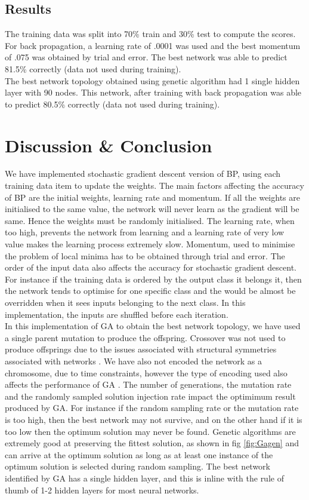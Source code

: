 \subsection{Results}
The training data was split into 70\% train and 30\% test to compute the scores. \\
For back propagation, a learning rate of .0001 was used and the best momentum of .075 was obtained by trial and error. The best network was able to predict  81.5\%  correctly (data not used during training).\\
The best network topology obtained using genetic algorithm had 1 single hidden layer with 90 nodes. This network, after training with back propagation was able to predict  80.5\%  correctly (data not used during training).
\section{Discussion \& Conclusion}
We have implemented stochastic gradient descent version of BP,  using each training data item to update the weights. The main factors affecting the accuracy of BP are the initial weights, learning rate and momentum. If all the weights are initialised to the same value, the network will never learn as the gradient will be same. Hence the weights must be randomly initialised.  The learning rate, when too high, prevents the network from learning and a learning rate of very low value makes the learning process extremely slow. Momentum, used to minimise the problem of local minima has to be obtained through trial and error.
The order of the input data also affects the accuracy for stochastic gradient descent. For instance if  the training data is ordered by the output class it belongs it, then the network tends to optimise for one specific class and the would be almost be overridden  when it sees inputs belonging to the next class.  In this implementation, the inputs are shuffled before each iteration.  \\In this implementation of GA to obtain the best network topology, we have used a single parent mutation to produce the offspring. Crossover was not used to produce offsprings due to the issues associated with structural symmetries associated with networks \cite{Branke1995}. We have also not encoded the network as a chromosome, due to time constraints, however the type of encoding used also affects the performance of GA \cite{Koehn1994}. The number of generations, the mutation rate and the randomly sampled solution injection rate impact the optimimum result produced by GA. For instance if the random sampling rate or the mutation rate is too high, then the best network may not survive, and on the other hand if it is too low then the optimum solution may never be found. Genetic algorithms are extremely good at preserving the fittest solution, as shown in  fig \ref{fig:Gagen} and can arrive at the optimum solution as long as at least one instance of the optimum solution is selected during random sampling. The best network identified by GA has a single hidden layer, and this is inline with the rule of thumb of 1-2 hidden layers for most neural networks.

